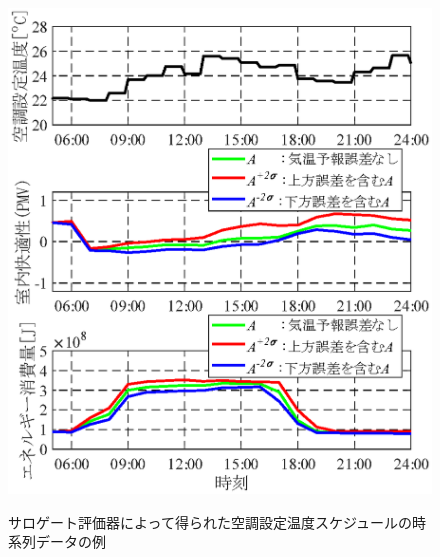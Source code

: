 \begin{figure}[htbp]
\begin{center}
\begin{minipage}{0.7\textwidth}
\begin{center}
        \includegraphics[width=1\textwidth,keepaspectratio=true]{fig/surrogate_result_schedule_robust_4obj.eps}\\\vspace{-5mm}{\small スケジュール X' (ロバスト性を考慮した4目的最適化で得た解)}
      \end{center}
    \end{minipage}
    \vspace{-1mm}
    \caption{サロゲート評価器によって得られた空調設定温度スケジュールの時系列データの例}
    \label{fig::surrogate_result_schedule_robust}
  \end{center}
\end{figure}

